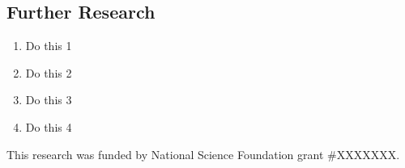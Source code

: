 \documentclass[maize,portrait]{a0poster}
\begin{document}
\begin{multicols}{4}

  \section*{Further Research}
  
  \begin{enumerate}
  \item Do this 1
  \item Do this 2
  \item Do this 3
  \item Do this 4
  \end{enumerate}


  \nocite{*} %


  {\small This research was funded by National Science Foundation grant \#XXXXXXX.}
  
  
\end{multicols}
\end{document}

